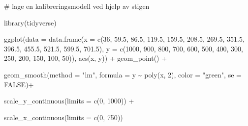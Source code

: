 \documentclass[
  letterpaper,
  DIV=11,
  numbers=noendperiod]{scrartcl}
\newenvironment{Shaded}{\begin{snugshade}}{\end{snugshade}}
\newcommand{\AttributeTok}[1]{\textcolor[rgb]{0.40,0.45,0.13}{#1}}
\newcommand{\CommentTok}[1]{\textcolor[rgb]{0.37,0.37,0.37}{#1}}
\newcommand{\ConstantTok}[1]{\textcolor[rgb]{0.56,0.35,0.01}{#1}}
\newcommand{\DecValTok}[1]{\textcolor[rgb]{0.68,0.00,0.00}{#1}}
\newcommand{\FloatTok}[1]{\textcolor[rgb]{0.68,0.00,0.00}{#1}}
\newcommand{\FunctionTok}[1]{\textcolor[rgb]{0.28,0.35,0.67}{#1}}
\newcommand{\NormalTok}[1]{\textcolor[rgb]{0.00,0.23,0.31}{#1}}
\newcommand{\SpecialCharTok}[1]{\textcolor[rgb]{0.37,0.37,0.37}{#1}}
\newcommand{\StringTok}[1]{\textcolor[rgb]{0.13,0.47,0.30}{#1}}
\begin{document}
\begin{Shaded}
\begin{Highlighting}[]
\CommentTok{\# lage en kalibreringsmodell ved hjelp av stigen}

\FunctionTok{library}\NormalTok{(tidyverse)}

\FunctionTok{ggplot}\NormalTok{(}\AttributeTok{data =} \FunctionTok{data.frame}\NormalTok{(}\AttributeTok{x =} \FunctionTok{c}\NormalTok{(}\DecValTok{36}\NormalTok{, }\FloatTok{59.5}\NormalTok{, }\FloatTok{86.5}\NormalTok{,}
                              \FloatTok{119.5}\NormalTok{, }\FloatTok{159.5}\NormalTok{, }\FloatTok{208.5}\NormalTok{,}
                              \FloatTok{269.5}\NormalTok{, }\FloatTok{351.5}\NormalTok{, }\FloatTok{396.5}\NormalTok{,}
                              \FloatTok{455.5}\NormalTok{, }\FloatTok{521.5}\NormalTok{, }\FloatTok{599.5}\NormalTok{, }\FloatTok{701.5}\NormalTok{), }
                         \AttributeTok{y =} \FunctionTok{c}\NormalTok{(}\DecValTok{1000}\NormalTok{, }\DecValTok{900}\NormalTok{, }\DecValTok{800}\NormalTok{, }
                            \DecValTok{700}\NormalTok{, }\DecValTok{600}\NormalTok{, }\DecValTok{500}\NormalTok{, }
                            \DecValTok{400}\NormalTok{, }\DecValTok{300}\NormalTok{, }\DecValTok{250}\NormalTok{, }
                            \DecValTok{200}\NormalTok{, }\DecValTok{150}\NormalTok{, }\DecValTok{100}\NormalTok{, }\DecValTok{50}\NormalTok{)), }
       \FunctionTok{aes}\NormalTok{(x, y)) }\SpecialCharTok{+} \FunctionTok{geom\_point}\NormalTok{() }\SpecialCharTok{+}
  
  \FunctionTok{geom\_smooth}\NormalTok{(}\AttributeTok{method =} \StringTok{"lm"}\NormalTok{, }\AttributeTok{formula =}\NormalTok{ y }\SpecialCharTok{\textasciitilde{}} \FunctionTok{poly}\NormalTok{(x, }\DecValTok{2}\NormalTok{), }
                    \AttributeTok{color =} \StringTok{"green"}\NormalTok{, }\AttributeTok{se =} \ConstantTok{FALSE}\NormalTok{)}\SpecialCharTok{+}
  
  \FunctionTok{scale\_y\_continuous}\NormalTok{(}\AttributeTok{limits =} \FunctionTok{c}\NormalTok{(}\DecValTok{0}\NormalTok{, }\DecValTok{1000}\NormalTok{)) }\SpecialCharTok{+}
  
  \FunctionTok{scale\_x\_continuous}\NormalTok{(}\AttributeTok{limits =} \FunctionTok{c}\NormalTok{(}\DecValTok{0}\NormalTok{, }\DecValTok{750}\NormalTok{))}
\end{Highlighting}
\end{Shaded}
\end{document}
